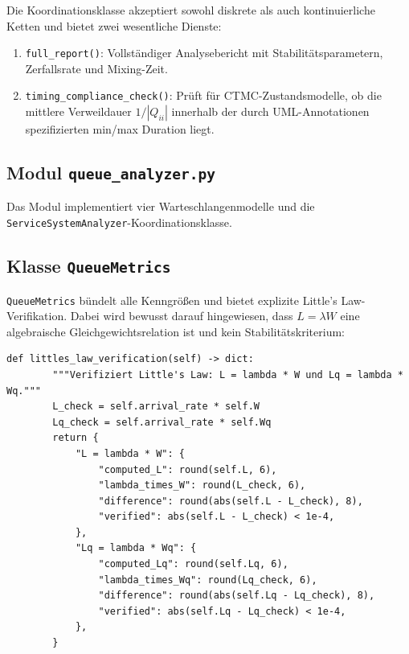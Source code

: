 ﻿\documentclass[a4paper,12pt]{report}
\theoremstyle{definition}
\begin{document}
Die Koordinationsklasse akzeptiert sowohl diskrete als auch kontinuierliche
Ketten und bietet zwei wesentliche Dienste:

\begin{enumerate}
	\item[-] \texttt{full\_report()}: Vollständiger Analysebericht mit
	Stabilitätsparametern, Zerfallsrate und Mixing-Zeit.
	\item[-] \texttt{timing\_compliance\_check()}: Prüft für CTMC-Zustandsmodelle,
	ob die mittlere Verweildauer $1/|Q_{ii}|$ innerhalb der durch
	UML-Annotationen spezifizierten min/max Duration liegt.
\end{enumerate}

\subsection{Modul \texttt{queue\_analyzer.py}}
\label{sec:queue-analyzer-impl}

Das Modul implementiert vier Warteschlangenmodelle und die
\texttt{ServiceSystemAnaly\newline zer}-Koordinationsklasse.

\subsection{Klasse \texttt{QueueMetrics}}

\texttt{QueueMetrics} bündelt alle Kenngrößen und bietet explizite
Little's Law-Verifikation. Dabei wird bewusst darauf hingewiesen, dass
$L = \lambda W$ eine algebraische Gleichgewichtsrelation ist und kein
Stabilitätskriterium:

\begin{lstlisting}[style=python, caption={Little's Law Verifikation mit theoretischem Hinweis}, label=lst:littles-law-impl]
def littles_law_verification(self) -> dict:
        """Verifiziert Little's Law: L = lambda * W und Lq = lambda * Wq."""
        L_check = self.arrival_rate * self.W
        Lq_check = self.arrival_rate * self.Wq
        return {
            "L = lambda * W": {
                "computed_L": round(self.L, 6),
                "lambda_times_W": round(L_check, 6),
                "difference": round(abs(self.L - L_check), 8),
                "verified": abs(self.L - L_check) < 1e-4,
            },
            "Lq = lambda * Wq": {
                "computed_Lq": round(self.Lq, 6),
                "lambda_times_Wq": round(Lq_check, 6),
                "difference": round(abs(self.Lq - Lq_check), 8),
                "verified": abs(self.Lq - Lq_check) < 1e-4,
            },
        }
\end{lstlisting}
\end{document}
